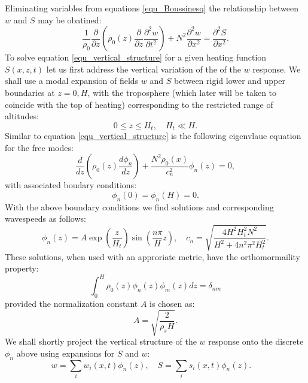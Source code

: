 \documentclass[a4paper,10pt]{article}
\begin{document}
Eliminating variables from equations \ref{equ_Boussinesq} the relationship between  $w$ and $S$ may be obatined:
%
\begin{equation}
\label{equ_vertical_structure}
\frac{1}{\rho_0} \frac{\partial}{\partial z} \left( \rho_0(z)  \frac{\partial}{\partial z} \frac{\partial^2 w}{\partial t^2} \right)  +N^2 \frac{\partial^2 w}{\partial x^2} = \frac{\partial^2 S}{\partial x^2}.
\end{equation}
%
To solve equation \ref{equ_vertical_structure} for a given heating function $S(x,z,t)$ let us first address the vertical variation of the of the $w$ response. 
We shall use a modal expansion of fields $w$ and $S$ between rigid lower and upper boundaries at
 $z=0,H$, with the troposphere (which later will be taken to coincide with the top of heating) corresponding to the restricted range of altitudes:
%
\begin{equation}
0 \leq z \leq H_t, \quad H_t \ll H.
\end{equation}
% 
Similar to equation \ref{equ_vertical_structure} is the following eigenvlaue equation for the free modes:
%
\begin{equation}
\label{equ_free_modes}
\frac{d}{dz} \left( \rho_0(z) \frac{d \phi_n}{dz} \right) + \frac{N^2 \rho_0(x)}{c_n^2} \phi_n(z) = 0,
\end{equation}
%
with associated boudary conditions:
%
\begin{equation}
\phi_n(0) = \phi_n(H) = 0.
\end{equation}
%
With the above boundary conditions we find solutions and corresponding wavespeeds as follows:
%
\begin{equation}
\phi_n(z) = A \exp \left( \frac{z}{H_t} \right) \sin \left( \frac{n \pi}{H} z\right), \quad c_n = \sqrt{  \frac{4 H^2 H_t^2 N^2 }{H^2 + 4 n^2 \pi^2 H_t^2} }.
\end{equation}
%
These solutions, when used with an approriate metric, have the orthomormaility property:
%
\begin{equation}
\int_0^H\rho_0(z)\phi_n(z) \phi_m(z) dz = \delta_{nm}
\end{equation}
%
provided the normalization constant $A$ is chosen as:
%
\begin{equation}
A = \sqrt{ \frac{2}{ \rho_s H} }.
\end{equation}
%
We shall shortly project the vertical structure of the $w$ response onto the discrete $\phi_n$ above using
expansions for $S$ and $w$:
%
\begin{equation}
\label{equ_modal}
w = \sum_i w_i(x,t) \phi_n(z), \quad S = \sum_i s_i(x,t) \phi_n(z). \quad
\end{equation}
\end{document}
